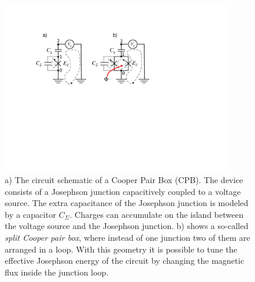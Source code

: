 \begin{figure}
	\centering
	\includegraphics[width=10cm]{"./material/figures/introduction/cooper_pair_box"}
	\caption{a) The circuit schematic of a Cooper Pair Box (CPB). The device consists of a Josephson junction capacitively coupled to a voltage source. The extra capacitance of the Josephson junction is modeled by a capacitor $C_\Sigma$. Charges can accumulate on the island between the voltage source and the Josephson junction. b) shows a so-called {\it split Cooper pair box}, where instead of one junction two of them are arranged in a loop. With this geometry it is possible to tune the effective Josephson energy of the circuit by changing the magnetic flux inside the junction loop.}
	\label{fig:cpb_circuit}
\end{figure}

